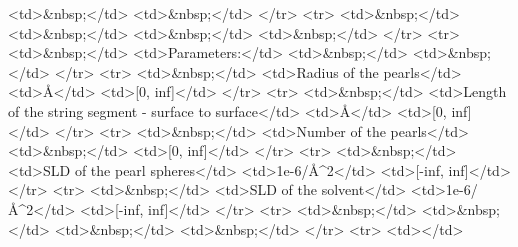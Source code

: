 \textless{}td\textgreater{}\&nbsp;\textless{}/td\textgreater{} \textless{}td\textgreater{}\&nbsp;\textless{}/td\textgreater{} \textless{}/tr\textgreater{} \textless{}tr\textgreater{} \textless{}td\textgreater{}\&nbsp;\textless{}/td\textgreater{} \textless{}td\textgreater{}\&nbsp;\textless{}/td\textgreater{} \textless{}td\textgreater{}\&nbsp;\textless{}/td\textgreater{} \textless{}td\textgreater{}\&nbsp;\textless{}/td\textgreater{} \textless{}/tr\textgreater{} \textless{}tr\textgreater{} \textless{}td\textgreater{}\&nbsp;\textless{}/td\textgreater{} \textless{}td\textgreater{}Parameters:\textless{}/td\textgreater{} \textless{}td\textgreater{}\&nbsp;\textless{}/td\textgreater{} \textless{}td\textgreater{}\&nbsp;\textless{}/td\textgreater{} \textless{}/tr\textgreater{} \textless{}tr\textgreater{} \textless{}td\textgreater{}\&nbsp;\textless{}/td\textgreater{} \textless{}td\textgreater{}Radius of the pearls\textless{}/td\textgreater{} \textless{}td\textgreater{}\AA{}\textless{}/td\textgreater{} \textless{}td\textgreater{}[0, inf]\textless{}/td\textgreater{} \textless{}/tr\textgreater{} \textless{}tr\textgreater{} \textless{}td\textgreater{}\&nbsp;\textless{}/td\textgreater{} \textless{}td\textgreater{}Length of the string segment - surface to surface\textless{}/td\textgreater{} \textless{}td\textgreater{}\AA{}\textless{}/td\textgreater{} \textless{}td\textgreater{}[0, inf]\textless{}/td\textgreater{} \textless{}/tr\textgreater{} \textless{}tr\textgreater{} \textless{}td\textgreater{}\&nbsp;\textless{}/td\textgreater{} \textless{}td\textgreater{}Number of the pearls\textless{}/td\textgreater{} \textless{}td\textgreater{}\&nbsp;\textless{}/td\textgreater{} \textless{}td\textgreater{}[0, inf]\textless{}/td\textgreater{} \textless{}/tr\textgreater{} \textless{}tr\textgreater{} \textless{}td\textgreater{}\&nbsp;\textless{}/td\textgreater{} \textless{}td\textgreater{}SLD of the pearl spheres\textless{}/td\textgreater{} \textless{}td\textgreater{}1e-6/\AA{}\textasciicircum{}2\textless{}/td\textgreater{} \textless{}td\textgreater{}[-inf, inf]\textless{}/td\textgreater{} \textless{}/tr\textgreater{} \textless{}tr\textgreater{} \textless{}td\textgreater{}\&nbsp;\textless{}/td\textgreater{} \textless{}td\textgreater{}SLD of the solvent\textless{}/td\textgreater{} \textless{}td\textgreater{}1e-6/\AA{}\textasciicircum{}2\textless{}/td\textgreater{} \textless{}td\textgreater{}[-inf, inf]\textless{}/td\textgreater{} \textless{}/tr\textgreater{} \textless{}tr\textgreater{} \textless{}td\textgreater{}\&nbsp;\textless{}/td\textgreater{} \textless{}td\textgreater{}\&nbsp;\textless{}/td\textgreater{} \textless{}td\textgreater{}\&nbsp;\textless{}/td\textgreater{} \textless{}td\textgreater{}\&nbsp;\textless{}/td\textgreater{} \textless{}/tr\textgreater{} \textless{}tr\textgreater{} \textless{}td\textgreater{}\textless{}/td\textgreater{}

